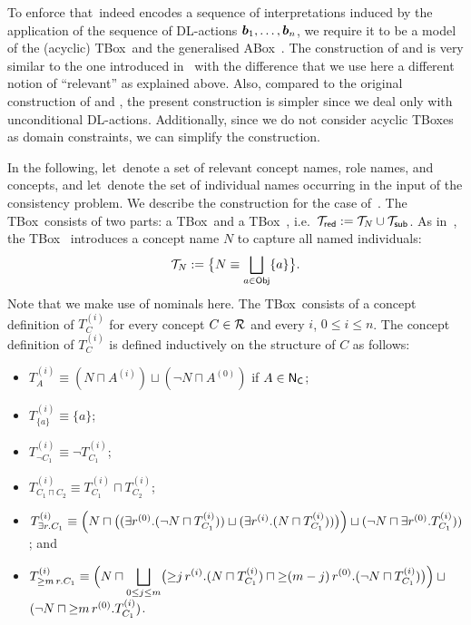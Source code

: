 To enforce that~\Jmc indeed encodes a sequence of interpretations induced by the
application of the sequence of DL-actions $\boldsymbol b_1,\dots,\boldsymbol b_n$, we require it
to be a model of the (acyclic) TBox~\Tred and the generalised ABox~\Ared.  The
construction of \Tred and \Ared is very similar to the one introduced
in~\cite{BLM+-LTCS-05-02} with the difference that we use here a different
notion of \enquote{relevant} as explained above.  Also, compared to the original
construction of \Ared and \Tred, the present construction is simpler since we
deal only with unconditional DL-actions.  Additionally, since we do not consider
acyclic TBoxes as domain constraints, we can simplify the construction.

In the following, let~\Rmc denote a set of relevant concept names, role names,
and concepts, and let~\Obj denote the set of individual names occurring in the
input of the consistency problem.  We describe the construction for the case
of~\ALCQIO.
%
The TBox~\Tred consists of two parts: a TBox~\TN and a TBox~\Tsub,
i.e.~$\mathcal{T}_\mathsf{red}:=\mathcal{T}_N\cup\mathcal{T}_\mathsf{sub}$.  As in~\cite{BLM+-LTCS-05-02}, the TBox~\TN
introduces a concept name $N$ to capture all named individuals:
\[\mathcal{T}_N:=\bigl\{N\equiv\bigsqcup_{a\in\mathsf{Obj}}\{a\}\bigr\}.\]
Note that we make use of nominals here.
%
The TBox~\Tsub consists of a concept definition of $T_C^{(i)}$ for every concept
$C\in\mathcal{R}$ and every $i$, $0\le i\le n$.  The concept definition of $T_C^{(i)}$
is defined inductively on the structure of $C$ as follows:
\begin{itemize}
    \item $T_A^{(i)}\equiv(N\sqcap A^{(i)})\sqcup(\lnot N\sqcap A^{(0)})$\quad
        if $A\in\mathsf{N_C}$;
    \item $T_{\{a\}}^{(i)}\equiv\{a\}$;
    \item $T_{\lnot C_1}^{(i)}\equiv\lnot T_{C_1}^{(i)}$;
    \item $T_{C_1\sqcap C_2}^{(i)}\equiv T_{C_1}^{(i)}\sqcap T_{C_2}^{(i)}$;
    \item $T_{\exists r.C_1}^{(i)}\equiv%
            \Bigl(N\sqcap\bigl((\exists r^{(0)}.(\lnot N\sqcap T_{C_1}^{(i)}))\sqcup%
            (\exists r^{(i)}.(N\sqcap T_{C_1}^{(i)}))\bigr)\Bigr)\sqcup%
            (\lnot N\sqcap\exists r^{(0)}.T_{C_1}^{(i)}))$; and
    \item $\displaystyle
            T_{\atLeast{m}{r}{C_1}}^{(i)}\equiv%
            \Bigl(N\sqcap\bigsqcup_{0\le j\le m}\bigl(%
            \atLeast{j}{r^{(i)}}{(N\sqcap T_{C_1}^{(i)})}\sqcap%
            \atLeast{(m-j)}{r^{(0)}}{(\lnot N\sqcap T_{C_1}^{(i)})}\bigr)\Bigr)\sqcup{}$\\
        $(\lnot N\sqcap {\ge}m\,r^{(0)}.T_{C_1}^{(i)})$.
\end{itemize}

